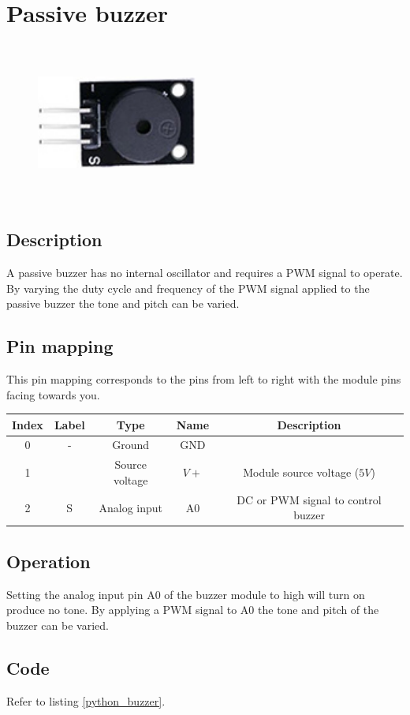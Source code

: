 \section{Passive buzzer}
\begin{figure}[H]
    \centering
    \includegraphics[angle=0, keepaspectratio=true, scale=1, width=200px, height=200px]{images/buzzer2.jpg}
\end{figure}
\subsection*{Description}
A passive buzzer has no internal oscillator and requires a PWM signal to operate. By varying the duty cycle and frequency of the PWM signal applied to the passive buzzer the tone and pitch can be varied.
\subsection*{Pin mapping}
This pin mapping corresponds to the pins from left to right with the module pins facing towards you.
\begin{table}[H]
    \centering
    \begin{tabular}{|c|c|c|c|c|}
    \hline
    Index &Label &Type &Name &Description\\ \hline
    0 &- &Ground &GND &\\ \hline
    1 & &Source voltage &$V+$ &Module source voltage ($5V$)\\ \hline
    2 &S &Analog input &A0 &DC or PWM signal to control buzzer\\ \hline
    \end{tabular}
\end{table}
\subsection*{Operation}
Setting the analog input pin A0 of the buzzer module to high will turn on produce no tone. By applying a PWM signal to A0 the tone and pitch of the buzzer can be varied.
\subsection*{Code}
Refer to listing \ref{python_buzzer}.
%